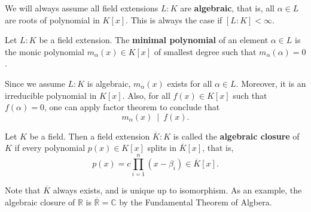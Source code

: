 We will always assume all field extensions $L:K$ are {\bf algebraic}, that is, all $\alpha \in L$ are roots of  polynomial in $K[x]$. This is always the case if $[L:K] < \infty$.
\begin{definition}
    Let $L:K$ be a field extension. The {\bf minimal polynomial} of an element $\alpha \in L$ is the monic polynomial $m_{\alpha}(x) \in K[x]$ of smallest degree such that $m_{\alpha}(\alpha) = 0$.
\end{definition}
Since we assume $L:K$ is algebraic, $m_{\alpha}(x)$ exists for all $\alpha \in L$. Moreover, it is an irreducible polynomial in $K[x]$. Also, for all $f(x) \in K[x]$ such that $f(\alpha) = 0$, one can apply factor theorem to conclude that
$$m_{\alpha}(x)\ \mid\ f(x).$$
\begin{definition}
    Let $K$ be a field. Then a field extension $\overline{K}:K$ is called the {\bf algebraic closure} of $K$ if every polynomial $p(x) \in K[x]$ splits in $\overline{K}[x]$, that is, 
    $$p(x) = c \prod_{i=1}^n(x - \beta_i) \in \overline{K}[x].$$
\end{definition}
Note that $\overline{K}$ always exists, and is unique up to isomorphism.
As an example, the algebraic closure of $\mathbb{R}$ is $\overline{\mathbb{R}} = \mathbb{C}$ by the Fundamental Theorem of Algbera. 

